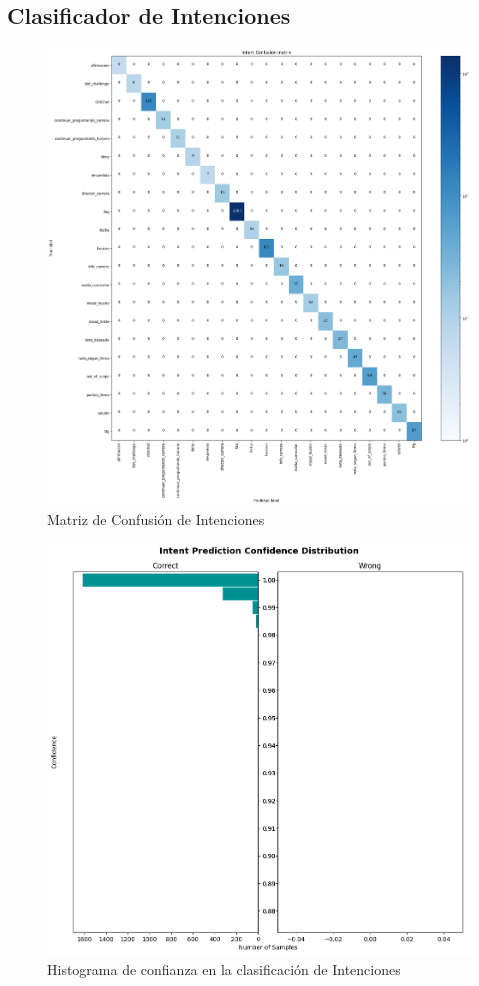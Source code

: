 \subsection{Clasificador de Intenciones}

\begin{figure}[H]
	\centering
	\includegraphics[width=\textwidth]{imagenes/cap5/intent_confusion_matrix.png}
	\caption{Matriz de Confusión de Intenciones}
	\label{fig:intent_matriz}
\end{figure}

\begin{figure}[H]
	\centering
	\includegraphics[width=\textwidth]{imagenes/cap5/intent_histogram.png}
	\caption{Histograma de confianza en la clasificación de Intenciones}
	\label{fig:intent_histograma}
\end{figure}

